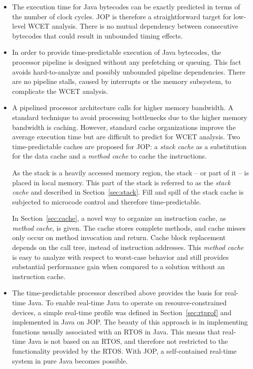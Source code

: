 \begin{itemize}

        \item
The execution time for Java bytecodes can be exactly predicted in
terms of the number of clock cycles.
JOP is therefore a straightforward target for low-level WCET
analysis. There is no mutual dependency between consecutive
bytecodes that could result in unbounded timing effects.

    \item
In order to provide time-predictable execution of Java bytecodes,
the processor pipeline is designed without any prefetching or
queuing. This fact avoids hard-to-analyze and possibly unbounded
pipeline dependencies. There are no pipeline stalls, caused by
interrupts or the memory subsystem, to complicate the WCET analysis.

    \item
A pipelined processor architecture calls for higher memory
bandwidth. A standard technique to avoid processing bottlenecks due
to the higher memory bandwidth is caching.
However, standard cache organizations improve the average execution
time but are difficult to predict for WCET analysis. Two
time-predictable caches are proposed for JOP: a \emph{stack cache}
as a substitution for the data cache and a \emph{method cache} to
cache the instructions.

As the stack is a heavily accessed memory region, the stack -- or
part of it -- is placed in local memory. This part of the stack is
referred to as the \emph{stack cache} and described in
Section~\ref{sec:stack}. Fill and spill of the stack cache is
subjected to microcode control and therefore time-predictable.

In Section~\ref{sec:cache}, a novel way to organize an
instruction cache, as \emph{method cache}, is given. The cache
stores complete methods, and cache misses only occur on method
invocation and return. Cache block replacement depends on the
call tree, instead of instruction addresses. This \emph{method
cache} is easy to analyze with respect to worst-case behavior and
still provides substantial performance gain when compared to a
solution without an instruction cache.

    \item The time-predictable processor described above provides
        the basis for real-time Java. To enable real-time Java to
        operate on resource-constrained devices, a simple
        real-time profile was defined in Section~\ref{sec:rtprof}
        and implemented in Java on JOP. The beauty of this
        approach is in implementing functions usually associated
        with an RTOS in Java. This means that real-time Java is
        not based on an RTOS, and therefore not restricted to the
        functionality provided by the RTOS. With JOP, a
        self-contained real-time system in pure Java becomes
        possible.


\end{itemize}
